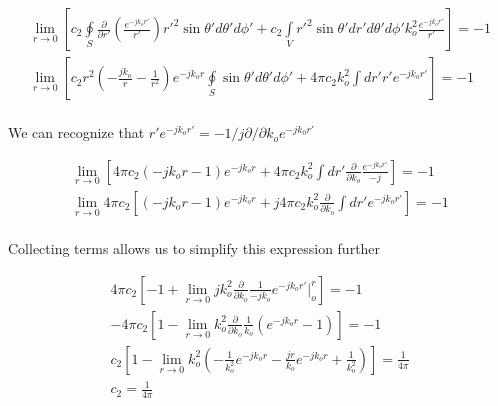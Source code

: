 \begin{equation}
\begin{gathered}
\lim_{r\to0}\left[c_2\oint\limits_{S}\frac{\partial }{\partial r'}\left(\frac{e^{-jk_or'}}{r'}\right) r'^2\sin{\theta'} d\theta' d\phi '+ c_2\int\limits_{V}r'^2 \sin{\theta'}dr' d\theta' d\phi' k_o^2\frac{e^{-jk_or'}}{r'}\right] = -1 \\
\lim_{r\to0}\left[c_2 r^2\left( -\frac{jk_o}{r} - \frac{1}{r^2}\right)e^{-jk_or}\oint\limits_{S}\sin{\theta'} d\theta' d\phi' + 4\pi c_2k_o^2\int dr' r'e^{-jk_or'}\right] = -1 \\
\end{gathered}
\label{gf_eq:25}
\end{equation}
\renewcommand{\baselinestretch}{2} \small\normalsize

\noindent We can recognize that $r' e^{-jk_o r'} = -1/j \partial/\partial k_o e^{-jk_0r'}$

\begin{equation}
\begin{gathered}
\lim_{r\to0}\left[4\pi c_2 \left( -jk_or - 1\right)e^{-jk_or}+ 4\pi c_2k_o^2\int dr' \frac{\partial }{\partial k_o}\frac{e^{-jk_or'}}{-j}\right] = -1 \\
\lim_{r\to0}4\pi c_2\left[\left( -jk_or - 1\right)e^{-jk_or}+ j4\pi c_2k_o^2\frac{\partial }{\partial k_o}\int dr'e^{-jk_or'} \right] = -1 \\
\end{gathered}
\label{gf_eq:25a}
\end{equation}
\renewcommand{\baselinestretch}{2} \small\normalsize

\noindent Collecting terms allows us to simplify this expression further

\begin{equation}
\begin{gathered}
4\pi c_2\left[-1 +  \lim_{r\to0}j k_o^2\frac{\partial}{\partial k_o}\frac{1}{-jk_o}e^{-jk_or'}\bigg|_o^r \right] = -1 \\
-4\pi c_2\left[1 - \lim_{r\to0}k_o^2\frac{\partial}{\partial k_o}\frac{1}{k_o}\left(e^{-jk_or} -1\right)\right] = -1 \\
c_2\left[1 - \lim_{r\to0}k_o^2\left(-\frac{1}{k_o^2}e^{-jk_or} -\frac{jr}{k_o}e^{-jk_or}+\frac{1}{k_o^2}\right)\right] = \frac{1}{4\pi} \\
 c_2 = \frac{1}{4\pi}
\end{gathered}
\label{gf_eq:25b}
\end{equation}
\renewcommand{\baselinestretch}{2} \small\normalsize

